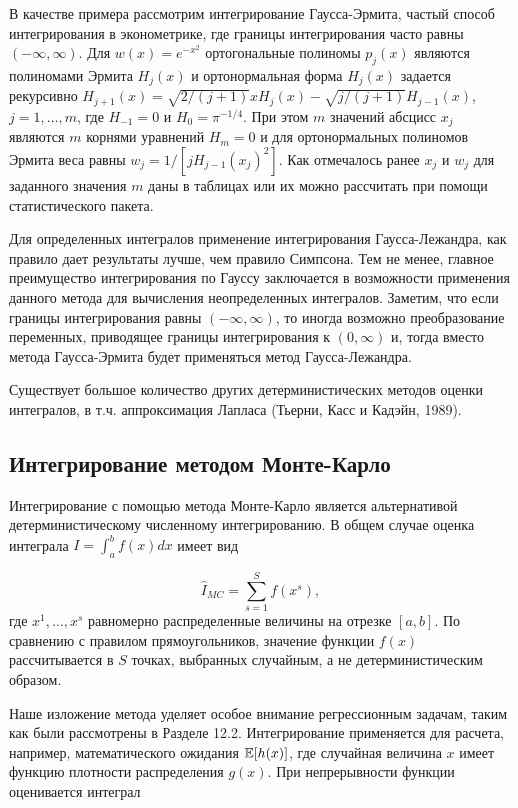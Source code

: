 В качестве примера рассмотрим интегрирование Гаусса-Эрмита, частый способ интегрирования в эконометрике, где границы интегрирования часто равны $(-\infty, \infty)$. Для $w(x)=e^{{-x}^2}$ ортогональные полиномы $p_{j}(x)$ являются полиномами Эрмита $H_{j}(x)$ и ортонормальная форма $H_{j}(x)$ задается рекурсивно $H_{j+1}(x)=\sqrt{2/(j+1)}xH_{j}(x)-\sqrt{j/(j+1)}H_{j-1}(x)$, $j=1,\ldots ,m$, где $H_{-1}=0$ и $H_0=\pi^{-1/4}$. При этом $m$ значений абсцисс $x_j$ являются $m$ корнями уравнений $H_{m}=0$ и для ортонормальных полиномов Эрмита веса равны $w_j=1/[jH_{j-1}(x_j)^2]$. Как отмечалось ранее $x_j$ и $w_j$ для заданного значения $m$ даны в таблицах или их можно рассчитать при помощи статистического пакета.

Для определенных интегралов применение интегрирования Гаусса-Лежандра, как правило дает результаты лучше, чем правило Симпсона. Тем не менее, главное преимущество интегрирования по Гауссу заключается в возможности применения данного метода для вычисления неопределенных интегралов. Заметим, что если границы интегрирования равны $(-\infty, \infty)$, то иногда возможно преобразование переменных, приводящее границы интегрирования к $(0,\infty)$ и, тогда вместо метода Гаусса-Эрмита будет применяться метод Гаусса-Лежандра.

Существует большое количество других детерминистических методов оценки интегралов, в т.ч. аппроксимация Лапласа (Тьерни, Касс и Кадэйн, 1989).

\subsection{Интегрирование методом Монте-Карло} 

Интегрирование с помощью метода Монте-Карло является альтернативой детерминистическому численному интегрированию. В общем случае оценка интеграла $I=\int^{b}_{a}f(x)dx$ имеет вид

\begin{equation}
\hat{I}_{MC}=\sum^{S}_{s=1}f(x^s),
\end{equation}
где $x^1,\ldots ,x^s$ равномерно распределенные величины на отрезке $[a,b]$. По сравнению с правилом прямоугольников, значение функции $f(x)$ рассчитывается в $S$ точках, выбранных случайным, а не детерминистическим  образом. 

Наше изложение метода уделяет особое внимание регрессионным задачам, таким как были рассмотрены в Разделе 12.2. Интегрирование применяется для расчета, например, математического ожидания $\mathbb{E}[h(x)]$, где случайная величина $x$ имеет функцию плотности распределения $g(x)$. При непрерывности функции оценивается интеграл 

